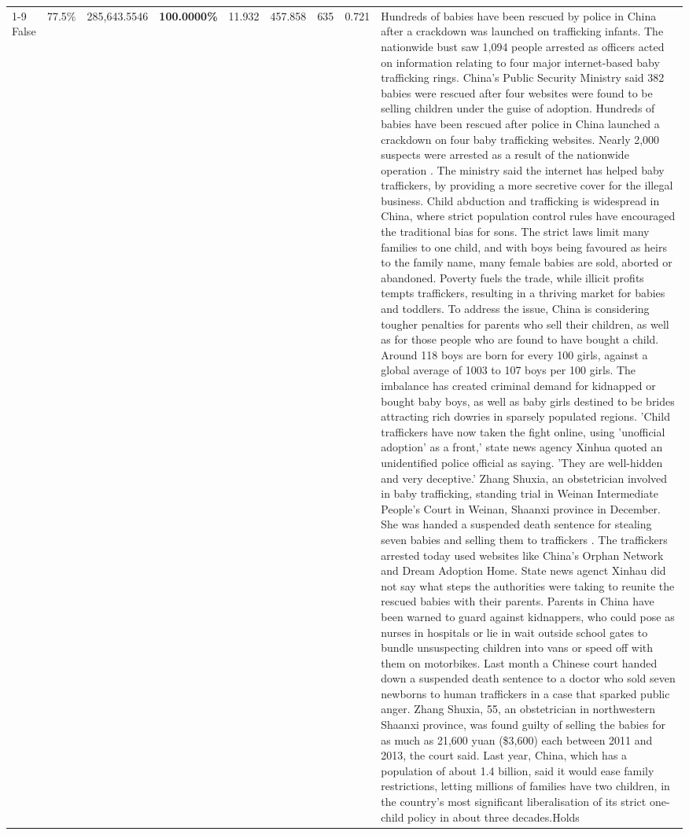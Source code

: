 \begin{table}[H]
\begin{tabular}{lllrlllll}
\cline{1-9}
False & 77.5\% & \color{red} 285,643.5546 & \bfseries \color{red} 100.0000\% & 11.932 & 457.858 & 635 & 0.721 & Hundreds of babies have been rescued by police in China after a crackdown was launched on trafficking infants. The nationwide bust saw 1,094 people arrested as officers acted on information relating to four major internet-based baby trafficking rings. China's Public Security Ministry said 382 babies were rescued after four websites were found to be selling children under the guise of adoption. Hundreds of babies have been rescued after police in China launched a crackdown on four baby trafficking websites. Nearly 2,000 suspects were arrested as a result of the nationwide operation . The ministry said the internet has helped baby traffickers, by providing a more secretive cover for the illegal business. Child abduction and trafficking is widespread in China, where strict population control rules have encouraged the traditional bias for sons. The strict laws limit many families to one child, and with boys being favoured as heirs to the family name, many female babies are sold, aborted or abandoned. Poverty fuels the trade, while illicit profits tempts traffickers, resulting in a thriving market for babies and toddlers. To address the issue, China is considering tougher penalties for parents who sell their children, as well as for those people who are found to have bought a child. Around 118 boys are born for every 100 girls, against a global average of 1003 to 107 boys per 100 girls. The imbalance has created criminal demand for kidnapped or bought baby boys, as well as baby girls destined to be brides attracting rich dowries in sparsely populated regions. 'Child traffickers have now taken the fight online, using 'unofficial adoption' as a front,' state news agency Xinhua quoted an unidentified police official as saying. 'They are well-hidden and very deceptive.' Zhang Shuxia, an obstetrician involved in baby trafficking, standing trial in Weinan Intermediate People's Court in Weinan, Shaanxi province in December. She was handed a suspended death sentence for stealing seven babies and selling them to traffickers . The traffickers arrested today used websites like China's Orphan Network and Dream Adoption Home. State news agenct Xinhau did not say what steps the authorities were taking to reunite the rescued babies with their parents. Parents in China have been warned to guard against kidnappers, who could pose as nurses in hospitals or lie in wait outside school gates to bundle unsuspecting children into vans or speed off with them on motorbikes. Last month a Chinese court handed down a suspended death sentence to a doctor who sold seven newborns to human traffickers in a case that sparked public anger. Zhang Shuxia, 55, an obstetrician in northwestern Shaanxi province, was found guilty of selling the babies for as much as 21,600 yuan (\$3,600) each between 2011 and 2013, the court said. Last year, China, which has a population of about 1.4 billion, said it would ease family restrictions, letting millions of families have two children, in the country's most significant liberalisation of its strict one-child policy in about three decades.Holds \\

\end{tabular}
\end{table}
